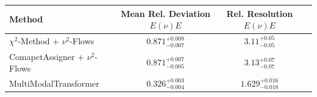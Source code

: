     \begin{tabular}{lccc}
        \toprule
        Method & Mean Rel. Deviation $E(\nu)E$ & Rel. Resolution $E(\nu)E$ \\
        \midrule
        $\chi^2$-Method + $\nu^2$-Flows & $0.871^{+0.008}_{-0.007}$ & $3.11^{+0.05}_{-0.05}$ \\
        ComapctAssigner + $\nu^2$-Flows & $0.871^{+0.007}_{-0.005}$ & $3.13^{+0.07}_{-0.07}$ \\
        MultiModalTransformer & $0.326^{+0.003}_{-0.004}$ & $1.629^{+0.016}_{-0.018}$ \\
        \bottomrule
    \end{tabular}